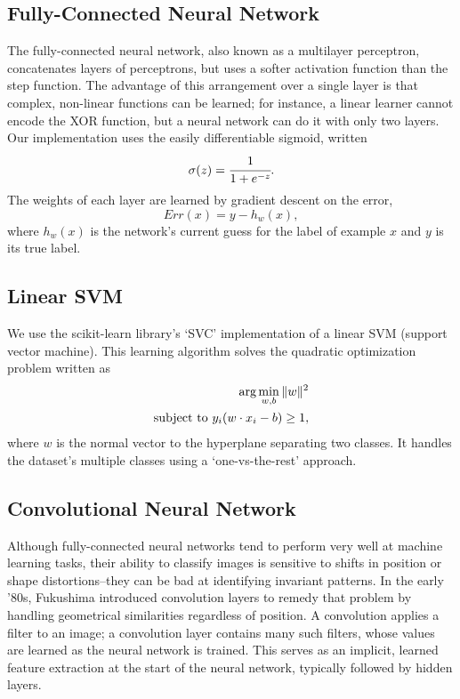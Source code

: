 \documentclass{acm_proc_article-sp}
\begin{document}
\subsection{Fully-Connected Neural Network}
The fully-connected neural network, also known as a multilayer perceptron, concatenates layers of perceptrons, but uses a softer activation function than the step function. The advantage of this arrangement over a single layer is that complex, non-linear functions can be learned; for instance, a linear learner cannot encode the XOR function, but a neural network can do it with only two layers. Our implementation uses the easily differentiable sigmoid, written $$\sigma(z) = \cfrac{1}{1 + e^{-z}}.$$ The weights of each layer are learned by gradient descent on the error, $$Err(x) = y - h_w(x),$$ where $h_w(x)$ is the network's current guess for the label of example $x$ and $y$ is its true label.

\subsection{Linear SVM}
We use the scikit-learn \cite{scikit-learn} library's `SVC' implementation of a linear SVM (support vector machine). This learning algorithm solves the quadratic optimization problem written as
\begin{align*} 
\hbox{arg} \min_{w,b} \|w\|^2 \\
\hbox{subject to } y_i(w \cdot x_i - b) \geq 1,
\end{align*}
where $w$ is the normal vector to the hyperplane separating two classes. It handles the dataset's multiple classes using a `one-vs-the-rest' approach.

\subsection{Convolutional Neural Network}
Although fully-connected neural networks tend to perform very well at machine learning tasks, their ability to classify images is sensitive to shifts in position or shape distortions--they can be bad at identifying invariant patterns. In the early '80s, Fukushima introduced convolution layers to remedy that problem by handling geometrical similarities regardless of position.\cite{Fukushima} A convolution applies a filter to an image; a convolution layer contains many such filters, whose values are learned as the neural network is trained. This serves as an implicit, learned feature extraction at the start of the neural network, typically followed by hidden layers.
\end{document}

